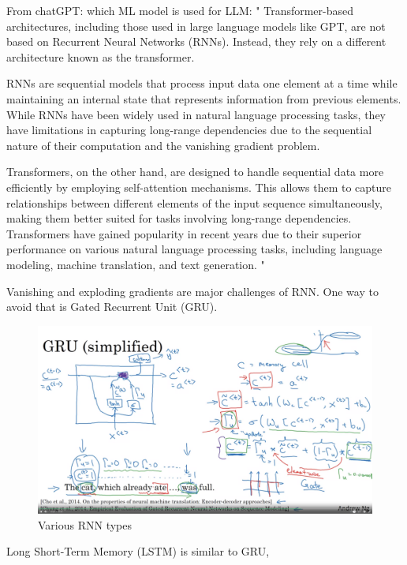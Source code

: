 \documentclass[12pt]{report}
\begin{document}
From chatGPT: which ML model is used for LLM:
"
Transformer-based architectures, including those used in large language models like GPT, are not based on Recurrent Neural Networks (RNNs). Instead, they rely on a different architecture known as the transformer.

RNNs are sequential models that process input data one element at a time while maintaining an internal state that represents information from previous elements. While RNNs have been widely used in natural language processing tasks, they have limitations in capturing long-range dependencies due to the sequential nature of their computation and the vanishing gradient problem.

Transformers, on the other hand, are designed to handle sequential data more efficiently by employing self-attention mechanisms. This allows them to capture relationships between different elements of the input sequence simultaneously, making them better suited for tasks involving long-range dependencies. Transformers have gained popularity in recent years due to their superior performance on various natural language processing tasks, including language modeling, machine translation, and text generation.
"

Vanishing and exploding gradients are major challenges of RNN. One way to avoid that is Gated Recurrent Unit (GRU).

\begin{figure}[H]
  \centering
  \includegraphics[trim =0.0cm 0.0cm 0.0cm 0.0cm, clip, scale=0.15]{pics/RNNGRU.png}
  \caption{Various RNN types}
\end{figure}

Long Short-Term Memory (LSTM) is similar to GRU,
\end{document}
